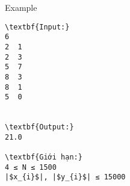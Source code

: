 Example
\begin{verbatim}
\textbf{Input:}
6
2  1
2  3
5  7
8  3
8  1
5  0


\textbf{Output:}
21.0

\textbf{Giới hạn:}
4 ≤ N ≤ 1500 
|$x_{i}$|, |$y_{i}$| ≤ 15000 
\end{verbatim}